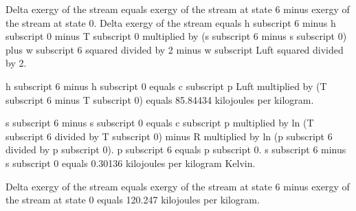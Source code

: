 Delta exergy of the stream equals exergy of the stream at state 6 minus exergy of the stream at state 0.  
Delta exergy of the stream equals h subscript 6 minus h subscript 0 minus T subscript 0 multiplied by (s subscript 6 minus s subscript 0) plus w subscript 6 squared divided by 2 minus w subscript Luft squared divided by 2.  

h subscript 6 minus h subscript 0 equals c subscript p Luft multiplied by (T subscript 6 minus T subscript 0) equals 85.84434 kilojoules per kilogram.  

s subscript 6 minus s subscript 0 equals c subscript p multiplied by ln (T subscript 6 divided by T subscript 0) minus R multiplied by ln (p subscript 6 divided by p subscript 0).  
p subscript 6 equals p subscript 0.  
s subscript 6 minus s subscript 0 equals 0.30136 kilojoules per kilogram Kelvin.  

Delta exergy of the stream equals exergy of the stream at state 6 minus exergy of the stream at state 0 equals 120.247 kilojoules per kilogram.